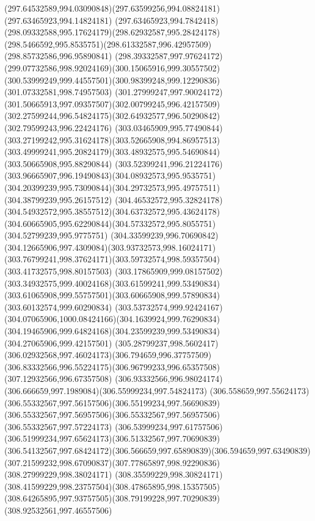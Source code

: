 {{		\curveto(297.64532589,994.03090848)(297.63599256,994.08824181)(297.63465923,994.14824181)
		\curveto(297.63465923,994.7842418)(298.09332588,995.17624179)(298.62932587,995.28424178)
		\curveto(298.5466592,995.8535751)(298.61332587,996.42957509)(298.85732586,996.95890841)
		\curveto(298.39332587,997.97624172)(299.07732586,998.92024169)(300.15065916,999.30557502)
		\curveto(300.53999249,999.44557501)(300.98399248,999.12290836)(301.07332581,998.74957503)
		\curveto(301.27999247,997.90024172)(301.50665913,997.09357507)(302.00799245,996.42157509)
		\curveto(302.27599244,996.54824175)(302.64932577,996.50290842)(302.79599243,996.22424176)
		\curveto(303.03465909,995.77490844)(303.27199242,995.31624178)(303.52665908,994.86957513)
		\curveto(303.49999241,995.20824179)(303.48932575,995.54690844)(303.50665908,995.88290844)
		\curveto(303.52399241,996.21224176)(303.96665907,996.19490843)(304.08932573,995.9535751)
		\curveto(304.20399239,995.73090844)(304.29732573,995.49757511)(304.38799239,995.26157512)
		\curveto(304.46532572,995.32824178)(304.54932572,995.38557512)(304.63732572,995.43624178)
		\curveto(304.60665905,995.62290844)(304.57332572,995.8055751)(304.52799239,995.9775751)
		\curveto(304.33599239,996.70690842)(304.12665906,997.4309084)(303.93732573,998.16024171)
		\curveto(303.76799241,998.37624171)(303.59732574,998.59357504)(303.41732575,998.80157503)
		\curveto(303.17865909,999.08157502)(303.34932575,999.40024168)(303.61599241,999.53490834)
		\curveto(303.61065908,999.55757501)(303.60665908,999.57890834)(303.60132574,999.60290834)
		\curveto(303.53732574,999.92424167)(304.07065906,1000.08424166)(304.1639924,999.76290834)
		\curveto(304.19465906,999.64824168)(304.23599239,999.53490834)(304.27065906,999.42157501)
		\curveto(305.28799237,998.5602417)(306.02932568,997.46024173)(306.794659,996.37757509)
		\curveto(306.83332566,996.55224175)(306.96799233,996.65357508)(307.12932566,996.67357508)
		\curveto(306.93332566,996.98024174)(306.666659,997.1989084)(306.55999234,997.54824173)
		\curveto(306.558659,997.55624173)(306.55332567,997.56157506)(306.55199234,997.56690839)
		\curveto(306.55332567,997.56957506)(306.55332567,997.56957506)(306.55332567,997.57224173)
		\curveto(306.53999234,997.61757506)(306.51999234,997.65624173)(306.51332567,997.70690839)
		\curveto(306.54132567,997.68424172)(306.566659,997.65890839)(306.594659,997.63490839)
		\curveto(307.21599232,998.67090837)(307.77865897,998.92290836)(308.27999229,998.38024171)
		\curveto(308.35599229,998.30824171)(308.41599229,998.23757504)(308.47865895,998.15357505)
		\curveto(308.64265895,997.93757505)(308.79199228,997.70290839)(308.92532561,997.46557506)
}}
